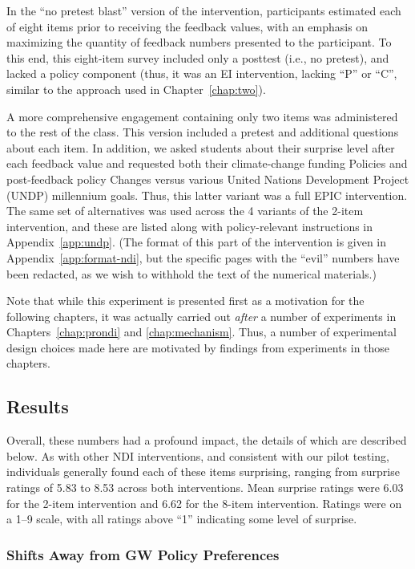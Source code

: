 In the “no pretest blast” version of the intervention, participants estimated
each of eight items prior to receiving the feedback values, with an emphasis on
maximizing the quantity of feedback numbers presented to the participant. To
this end, this eight-item survey included only a posttest (i.e., no pretest),
and lacked a policy component (thus, it was an EI intervention, lacking ``P'' or
``C'', similar to the approach used in Chapter~\ref{chap:two}). 

A more comprehensive engagement containing only two items was administered to
the rest of the class. This version included a pretest and additional questions
about each item. In addition, we asked students about their surprise level after
each feedback value and requested both their climate-change funding Policies and
post-feedback policy Changes versus various United Nations Development Project
(UNDP) millennium goals.  Thus, this
latter variant was a full EPIC intervention. The same set of alternatives was
used across the 4 variants of the 2-item intervention, and these are listed
along with policy-relevant instructions in Appendix~\ref{app:undp}. (The
format of this part of the intervention is given in
Appendix~\ref{app:format-ndi}, but the specific pages with the “evil” numbers
have been redacted, as we wish to withhold the text of the numerical
materials.)

Note that while this experiment is presented first as a motivation for the
following chapters, it was actually carried out \emph{after} a number of
experiments in Chapters~\ref{chap:prondi} and \ref{chap:mechanism}. Thus, a
number of experimental design choices made here are motivated by findings from
experiments in those chapters.

\subsection{Results}

Overall, these numbers had a profound impact, the details of which are described
below. As with other NDI interventions, and consistent with our pilot testing,
individuals generally found each of these items surprising, ranging from
surprise ratings of 5.83 to 8.53 across both interventions. Mean surprise
ratings were 6.03 for the 2-item intervention and 6.62 for the 8-item
intervention. Ratings were on a 1--9 scale, with all ratings above “1”
indicating some level of surprise.

\subsubsection{Shifts Away from GW Policy Preferences}

